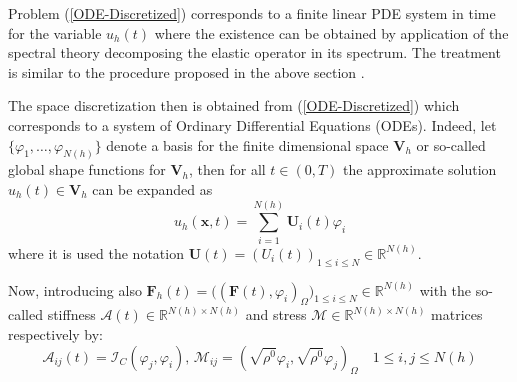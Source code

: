 Problem (\ref{ODE-Discretized}) corresponds to a finite linear PDE system in time for the variable $u_h(t)$ where the existence can be obtained by application of the spectral theory decomposing the elastic operator in its spectrum. The treatment is similar to the procedure proposed in the above section \cite{raviart1983introduction}.

The space discretization then is obtained from (\ref{ODE-Discretized}) which corresponds to a system of Ordinary Differential Equations (ODEs). Indeed, let $\{ \varphi_1, \dots, \varphi_{N(h)} \}$ denote a basis for the finite dimensional space $\mathbf{V}_h$ or so-called global shape functions for $\mathbf{V}_h$, then for all $t \in (0,T)$ the approximate solution $u_h(t) \in \mathbf{V}_h$ can be expanded as
\begin{equation*}
    u_h(\mathbf{x},t) = \sum \limits_{i=1}^{N(h)} \mathbf{U}_i(t) \varphi_i
\end{equation*}
where it is used the notation $\mathbf{U}(t) = (U_i(t))_{1 \leq i \leq N} \in \mathbb{R}^{N(h)}$.

Now, introducing also $\mathbf{F}_h(t) = \big( (\mathbf{F}(t), \varphi_i)_{\Omega} \big)_{1 \leq i \leq N}\in \mathbb{R}^{N(h)}$ with the so-called stiffness $\mathcal{A}(t) \in \mathbb{R}^{N(h) \times N(h)}$ and stress $\mathcal{M} \in \mathbb{R}^{N(h) \times N(h)}$ matrices respectively by:
\begin{equation*}
    \mathcal{A}_{ij}(t) = \mathcal{I}_C(\varphi_j, \varphi_i), \, \mathcal{M}_{ij} = (\sqrt{\rho^0} \varphi_i , \sqrt{\rho^0}\varphi_j)_{\Omega} \quad 1 \leq i,j \leq N(h)
\end{equation*}

